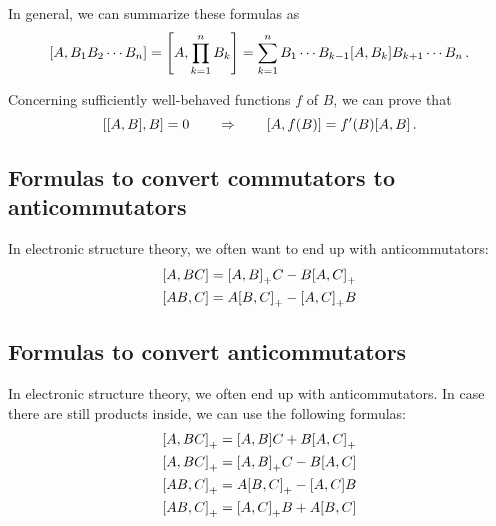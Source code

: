         In general, we can summarize these formulas as
        \begin{equation}
            \comm{A}{B_1 B_2 \cdots B_n} = \comm{A}{\prod_{k=1}^n B_k} = \sum_{k=1}^n B_1 \cdots B_{k-1} \comm{A}{B_k} B_{k+1} \cdots B_n \thinspace .
        \end{equation}

        Concerning sufficiently well-behaved functions $f$ of $B$, we can prove that
        \begin{equation}
            \comm{\comm{A}{B}}{B} = 0 \qquad\Rightarrow\qquad \comm{A}{f(B)} = f'(B) \comm{A}{B} \thinspace .
        \end{equation}

    \subsection{Formulas to convert commutators to anticommutators}
        In electronic structure theory, we often want to end up with anticommutators:
        \begin{align}
            & \comm{A}{BC} = \comm{A}{B}_+ C - B \comm{A}{C}_+ \\
            & \comm{AB}{C} = A \comm{B}{C}_+ - \comm{A}{C}_+ B
        \end{align}

    \subsection{Formulas to convert anticommutators}
        In electronic structure theory, we often end up with anticommutators. In case there are still products inside, we can use the following formulas:
        \begin{align}
            & \comm{A}{BC}_+ = \comm{A}{B} C + B \comm{A}{C}_+ \\
            & \comm{A}{BC}_+ = \comm{A}{B}_+ C - B \comm{A}{C} \\
            & \comm{AB}{C}_+ = A \comm{B}{C}_+ - \comm{A}{C} B \\
            & \comm{AB}{C}_+ = \comm{A}{C}_+ B + A \comm{B}{C}
        \end{align}
